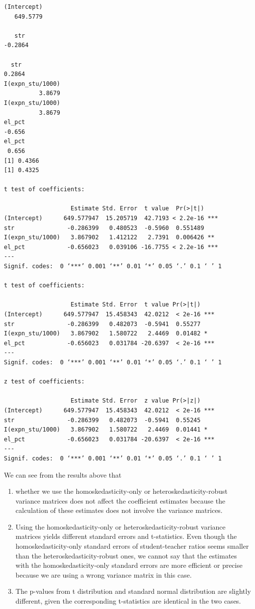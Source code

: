 \documentclass[11pt]{article}
\begin{document}
\begin{verbatim}
(Intercept)
   649.5779

   str
-0.2864

  str
0.2864
I(expn_stu/1000)
          3.8679
I(expn_stu/1000)
          3.8679
el_pct
-0.656
el_pct
 0.656
[1] 0.4366
[1] 0.4325

t test of coefficients:

                   Estimate Std. Error  t value  Pr(>|t|)
(Intercept)      649.577947  15.205719  42.7193 < 2.2e-16 ***
str               -0.286399   0.480523  -0.5960  0.551489
I(expn_stu/1000)   3.867902   1.412122   2.7391  0.006426 **
el_pct            -0.656023   0.039106 -16.7755 < 2.2e-16 ***
---
Signif. codes:  0 ‘***’ 0.001 ‘**’ 0.01 ‘*’ 0.05 ‘.’ 0.1 ‘ ’ 1

t test of coefficients:

                   Estimate Std. Error  t value Pr(>|t|)
(Intercept)      649.577947  15.458343  42.0212  < 2e-16 ***
str               -0.286399   0.482073  -0.5941  0.55277
I(expn_stu/1000)   3.867902   1.580722   2.4469  0.01482 *
el_pct            -0.656023   0.031784 -20.6397  < 2e-16 ***
---
Signif. codes:  0 ‘***’ 0.001 ‘**’ 0.01 ‘*’ 0.05 ‘.’ 0.1 ‘ ’ 1

z test of coefficients:

                   Estimate Std. Error  z value Pr(>|z|)
(Intercept)      649.577947  15.458343  42.0212  < 2e-16 ***
str               -0.286399   0.482073  -0.5941  0.55245
I(expn_stu/1000)   3.867902   1.580722   2.4469  0.01441 *
el_pct            -0.656023   0.031784 -20.6397  < 2e-16 ***
---
Signif. codes:  0 ‘***’ 0.001 ‘**’ 0.01 ‘*’ 0.05 ‘.’ 0.1 ‘ ’ 1
\end{verbatim}

We can see from the results above that
\begin{enumerate}
\item whether we use the homoskedasticity-only or
heteroskedasticity-robust variance matrices does not affect the
coefficient estimates because the calculation of these estimates
does not involve the variance matrices.
\item Using the homoskedasticity-only or
heteroskedasticity-robust variance matrices yields different
standard errors and t-statistics. Even though the
homoskedasticity-only standard errors of student-teacher ratios
seems smaller than the heteroskedasticity-robust ones, we cannot
say that the estimates with the homoskedasticity-only standard
errors are more efficient or precise because we are using a wrong
variance matrix in this case.
\item The p-values from t distribution and standard normal distribution
are slightly different, given the corresponding t-statistics are
identical in the two cases.
\end{enumerate}
\end{document}
